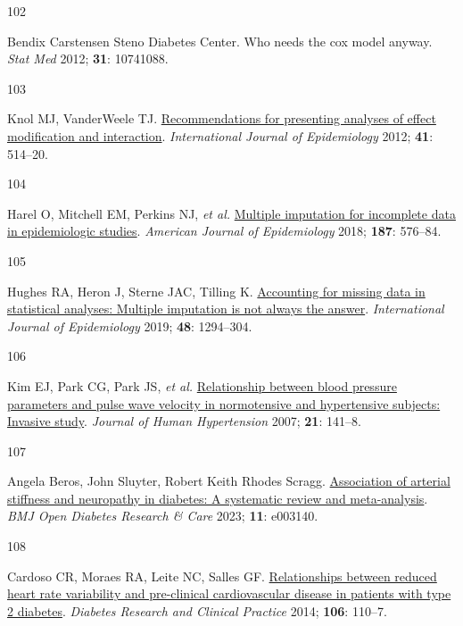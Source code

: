 \documentclass[
  a4paper,
  headsepline=true,
  open=left]{scrbook}
\newlength{\cslhangindent}
\newlength{\csllabelwidth}
\newlength{\cslentryspacingunit} %
\newenvironment{CSLReferences}[2] %
 {%
  \setlength{\parindent}{0pt}
  \ifodd #1
  \let\oldpar\par
  \def\par{\hangindent=\cslhangindent\oldpar}
  \fi
  \setlength{\parskip}{#2\cslentryspacingunit}
 }%
 {}
\newcommand{\CSLLeftMargin}[1]{\parbox[t]{\csllabelwidth}{#1}}
\newcommand{\CSLRightInline}[1]{\parbox[t]{\linewidth - \csllabelwidth}{#1}\break}
\begin{document}
\begin{CSLReferences}{0}{0}
\leavevmode{}%
\CSLLeftMargin{102 }%
\CSLRightInline{Bendix Carstensen Steno Diabetes Center. Who needs the
cox model anyway. \emph{Stat Med} 2012; \textbf{31}: 10741088.}

\leavevmode{}%
\CSLLeftMargin{103 }%
\CSLRightInline{Knol MJ, VanderWeele TJ.
\href{https://doi.org/10.1093/ije/dyr218}{Recommendations for presenting
analyses of effect modification and interaction}. \emph{International
Journal of Epidemiology} 2012; \textbf{41}: 514--20.}

\leavevmode{}%
\CSLLeftMargin{104 }%
\CSLRightInline{Harel O, Mitchell EM, Perkins NJ, \emph{et al.}
\href{https://doi.org/10.1093/aje/kwx349}{Multiple imputation for
incomplete data in epidemiologic studies}. \emph{American Journal of
Epidemiology} 2018; \textbf{187}: 576--84.}

\leavevmode{}%
\CSLLeftMargin{105 }%
\CSLRightInline{Hughes RA, Heron J, Sterne JAC, Tilling K.
\href{https://doi.org/10.1093/ije/dyz032}{Accounting for missing data in
statistical analyses: Multiple imputation is not always the answer}.
\emph{International Journal of Epidemiology} 2019; \textbf{48}:
1294--304.}

\leavevmode{}%
\CSLLeftMargin{106 }%
\CSLRightInline{Kim EJ, Park CG, Park JS, \emph{et al.}
\href{https://doi.org/10.1038/sj.jhh.1002120}{Relationship between blood
pressure parameters and pulse wave velocity in normotensive and
hypertensive subjects: Invasive study}. \emph{Journal of Human
Hypertension} 2007; \textbf{21}: 141--8.}

\leavevmode{}%
\CSLLeftMargin{107 }%
\CSLRightInline{Angela Beros, John Sluyter, Robert Keith Rhodes Scragg.
\href{https://doi.org/10.1136/bmjdrc-2022-003140}{Association of
arterial stiffness and neuropathy in diabetes: A systematic review and
meta-analysis}. \emph{BMJ Open Diabetes Research \& Care} 2023;
\textbf{11}: e003140.}

\leavevmode{}%
\CSLLeftMargin{108 }%
\CSLRightInline{Cardoso CR, Moraes RA, Leite NC, Salles GF.
\href{https://doi.org/10.1016/j.diabres.2014.07.005}{Relationships
between reduced heart rate variability and pre-clinical cardiovascular
disease in patients with type 2 diabetes}. \emph{Diabetes Research and
Clinical Practice} 2014; \textbf{106}: 110--7.}


\end{CSLReferences}
\end{document}
